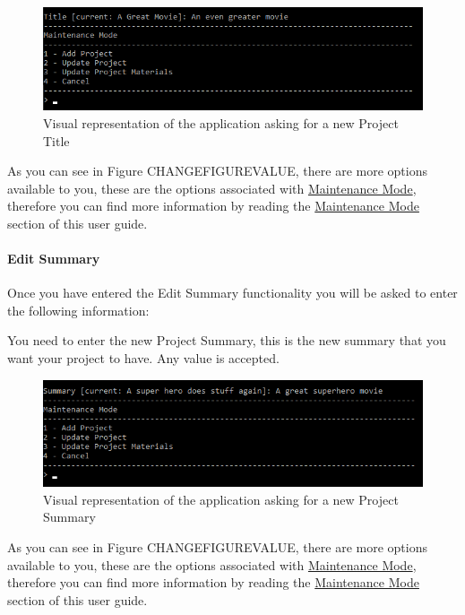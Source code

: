 \documentclass[
  english,
  a4paper,
,tablecaptionabove
]{scrartcl}
\begin{document}
\begin{figure}
\centering
\includegraphics{images/user-guide/maintenance-mode/update-project-title.png}
\caption{Visual representation of the application asking for a new
Project Title}
\end{figure}

As you can see in Figure CHANGEFIGUREVALUE, there are more options
available to you, these are the options associated with
\protect\hyperlink{using-maintenance-mode}{Maintenance Mode}, therefore
you can find more information by reading the
\protect\hyperlink{using-maintenance-mode}{Maintenance Mode} section of
this user guide.

\newpage

\hypertarget{edit-summary}{%
\paragraph{Edit Summary}\label{edit-summary}}

Once you have entered the Edit Summary functionality you will be asked
to enter the following information:

You need to enter the new Project Summary, this is the new summary that
you want your project to have. Any value is accepted.

\begin{figure}
\centering
\includegraphics{images/user-guide/maintenance-mode/update-project-summary.png}
\caption{Visual representation of the application asking for a new
Project Summary}
\end{figure}

As you can see in Figure CHANGEFIGUREVALUE, there are more options
available to you, these are the options associated with
\protect\hyperlink{using-maintenance-mode}{Maintenance Mode}, therefore
you can find more information by reading the
\protect\hyperlink{using-maintenance-mode}{Maintenance Mode} section of
this user guide.
\end{document}
